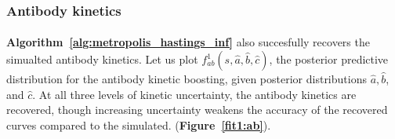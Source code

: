 \subsubsection{Antibody kinetics}

\paragraph{} \textbf{Algorithm~\ref{alg:metropolis_hastings_inf}} also succesfully recovers the simualted antibody kinetics. Let us plot $f^1_{ab}(s, \hat{a}, \hat{b}, \hat{c})$, the posterior predictive distribution for the antibody kinetic boosting, given posterior distributions  $\hat{a}, \hat{b}$, and $\hat{c}$. At all three levels of kinetic uncertainty, the antibody kinetics are recovered, though increasing uncertainty weakens the accuracy of the recovered curves compared to the simulated. (\textbf{Figure~\ref{fit1:ab}}).


